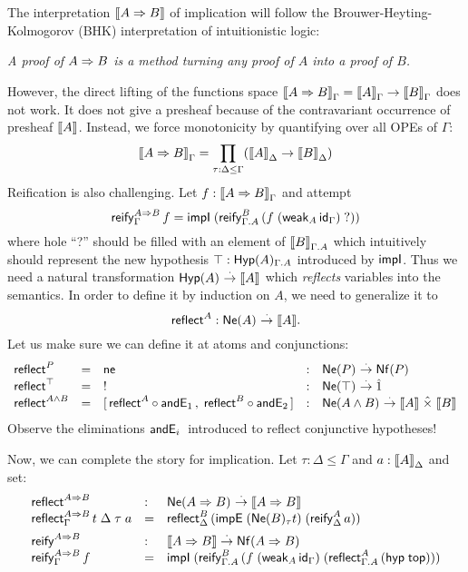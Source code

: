 \documentclass[a4paper]{article}
\begin{document}
The interpretation $\den{A \imp B}$ of implication will follow the
Brouwer-Heyting-Kolmogorov (BHK) interpretation of intuitionistic
logic:
\begin{center}\itshape
  A proof of $A \imp B$ is a method turning any proof of $A$ into a
  proof of $B$.
\end{center}
However, the direct lifting of the functions space $\den{A \imp
  B}_\Gamma = \den A_\Gamma \to \den B_\Gamma$ does not work.  It does
not give a presheaf because of the contravariant occurrence of
presheaf $\den A$.  Instead, we force monotonicity by quantifying over
all OPEs of $\Gamma$:
\[
  \den{A \imp B}_\Gamma = \prod_{\tau : \Delta \leq \Gamma} (\den A
  _\Delta \to \den B _\Delta)
\]
Reification is also challenging.  Let $f : \den{A \imp B}_\Gamma$ and
attempt
\[
  \reify[\Gamma]{A \imp B} f %
    = \impIP {\reify[\Gamma.A]B{(f\;(\weak[A]{\id[\Gamma]})}\;\mbox{?})}
\]
where hole ``?'' should be filled with an element of $\den B_{\Gamma.A}$
which intuitively should represent the new hypothesis $\top :
\Hyp[\Gamma.A]A$ introduced by $\timpI$.  Thus we need a natural
transformation $\Hyp A \todot \den A$ which \emph{reflects} variables
into the semantics.  In order to define it by
induction on $A$, we need to generalize it to
\[
  \treflect^A : \Ne A \todot \den A
  .
\]
Let us make sure we can define it at atoms and conjunctions:
\[
\begin{array}{lllll}
  \treflect^P & = & \tne & : & \Ne P \todot \Nf P \\
  \treflect^\top & = & !  & : & \Ne \top \todot \hatone \\
  \treflect^{A \land B} & = & [\, \treflect^A \comp \andE1  , \;
                             \treflect^B \comp \andE2 ]
    & : & \Ne{A \land B} \todot \den A \hattimes \den B \\
\end{array}
\]
Observe the eliminations $\andE i$ introduced to reflect conjunctive hypotheses!

Now, we can complete the story for implication.  Let $\tau : \Delta
\leq \Gamma$ and $a : \den A_\Delta$ and set:
\[
\begin{array}{lll}
  \treflect^{A \imp B} & : & \Ne{A \imp B} \todot \den{A \imp B} \\
  \reflect[\Gamma]{A \imp B} t\;\Delta\;\tau\;a & = &
    \reflect[\Delta]B{(\impEP {\Ne[\tau] B t} {(\reify[\Delta] A a)})}
\\[1ex]
  \treify^{A \imp B} & : & \den{A \imp B} \todot \Nf{A \imp B} \\
  \reify[\Gamma]{A \imp B} f & = &
    \impIP {\reify[\Gamma.A]B{(f\;(\weak[A]{\id[\Gamma]})}\;(\reflect[\Gamma.A]A{(\hyp\ttop)})}
\end{array}
\]
\end{document}

